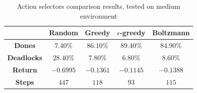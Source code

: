 \documentclass[a4paper,10pt]{report}
\begin{document}
\begin{table}[h]
	\center
	\begin{tabular}{|c|c|c|c|c|}
		\hline & \textbf{Random} & \textbf{Greedy} & \textbf{$\epsilon$-greedy} & \textbf{Boltzmann} \\ \hline
		\textbf{Dones}    & $7.40\%$ & $86.10\%$ & $89.40\%$ & $84.90\%$  \\ \hline
		\textbf{Deadlocks} & $28.40\%$ & $7.80\%$ & $6.80\%$ & $8.60\%$ \\ \hline
		\textbf{Return}    & $-0.6995$ & $-0.1361$ & $-0.1145$ & $-0.1388$ \\ \hline
		\textbf{Steps}     & $447$ & $118$ & $93$ & $115$ \\ \hline
	\end{tabular}
	\caption{Action selectors comparison results, tested on medium environment}
	\label{table:action-selectors-res}
\end{table}
\end{document}
